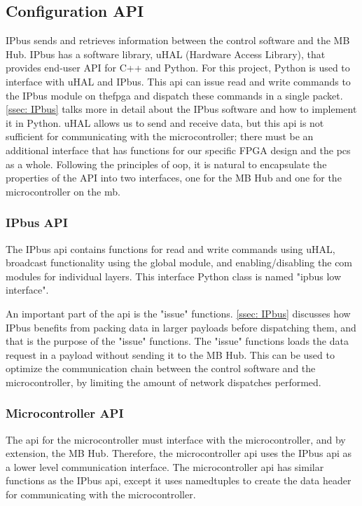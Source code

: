 \documentclass[main.tex]{subfiles}
\begin{document}
\subsection{Configuration API}
\label{ssec: mcu_api}
IPbus sends and retrieves information between the control software and the MB Hub. IPbus has a software library, uHAL (Hardware Access Library), that provides end-user API for C++ and Python. For this project,  Python is used to interface with uHAL and IPbus. This \gls{api} can issue read and write commands to the IPbus module on the\gls{fpga} and dispatch these commands in a single packet. \autoref{ssec: IPbus} talks more in detail about the IPbus software and how to implement it in Python. uHAL allows us to send and receive data, but this \gls{api} is not sufficient for communicating with the microcontroller; there must be an additional interface that has functions for our specific FPGA design and the \gls{pcs} as a whole. Following the principles of \gls{oop}, it is natural to encapsulate the properties of the API into two interfaces, one for the MB Hub and one for the microcontroller on the \gls{mb}.

\subsubsection{IPbus API}
The IPbus \gls{api} contains functions for read and write commands using uHAL, broadcast functionality using the global module, and enabling/disabling the com modules for individual layers. This interface Python class is named "ipbus low interface".

An important part of the \gls{api} is the "issue" functions. \autoref{ssec: IPbus} discusses how IPbus benefits from packing data in larger payloads before dispatching them, and that is the purpose of the "issue" functions. The "issue" functions loads the data request in a payload without sending it to the MB Hub. This can be used to optimize the communication chain between the control software and the microcontroller, by limiting the amount of network dispatches performed.

\subsubsection{Microcontroller API}

The \gls{api} for the microcontroller must interface with the microcontroller, and by extension, the MB Hub. Therefore, the microcontroller \gls{api} uses the IPbus \gls{api} as a lower level communication interface. The microcontroller \gls{api} has similar functions as the IPbus \gls{api}, except it uses namedtuples to create the data header for communicating with the microcontroller.
\end{document}
